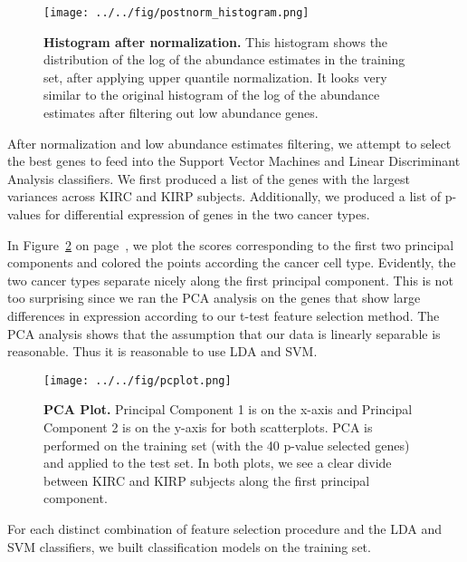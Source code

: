 \begin{figure}[H]
  \centering
    \texttt{[image: ../../fig/postnorm\_histogram.png]}
\caption{\textbf{Histogram after normalization.} This histogram shows the distribution
  of the log of the abundance estimates in the training set, after applying upper quantile
  normalization. It looks very similar to the original histogram of the
  log of the abundance estimates after filtering out low abundance genes.}
   \label{fig:histogrampost}
\end{figure}

After normalization and low abundance estimates filtering, we attempt to select the
best genes to feed into the Support Vector Machines and Linear Discriminant
Analysis classifiers.  We first produced a list of the genes with the largest
variances across KIRC and KIRP subjects.
Additionally, we produced a list of p-values for
differential expression of genes in the two cancer types.


In Figure~\ref{fig:pca} on page~\pageref{fig:pca}, we plot the scores
corresponding to the first two principal components and colored the points
according the cancer cell type.  Evidently, the two cancer types separate
nicely along the first principal component. This is not too surprising since we ran the PCA analysis on the genes that show large differences in expression according to our t-test feature selection method.   The PCA analysis shows that the assumption that our data is linearly separable is reasonable. Thus it is reasonable to use LDA and SVM. 

\begin{figure}[H]
  \centering
    \texttt{[image: ../../fig/pcplot.png]}
\caption{\textbf{PCA Plot.} Principal Component 1 is on the x-axis and Principal
  Component 2 is on the y-axis for both scatterplots.  PCA is performed on the
  training set (with the 40 p-value selected genes) and applied to the test set.
  In both plots, we see a clear divide between 	KIRC and KIRP subjects along
  the first principal component.}
   \label{fig:pca}
\end{figure}

For each distinct combination of feature selection procedure and the LDA and
SVM classifiers, we built classification models on the training set.

